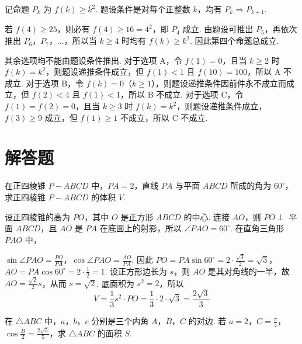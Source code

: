 \begin{solution}
记命题 \(P_k\) 为 \(f(k)\geqslant k^2\). 题设条件是对每个正整数 \(k\)，均有 \(P_k\Rightarrow P_{k+1}\).

若 \(f(4)\geqslant25\)，则必有 \(f(4)\geqslant16=4^2\)，即 \(P_4\) 成立. 由题设可推出 \(P_5\)，再依次推出 \(P_6\)，\(P_7\)，\(\ldots\)，所以当 \(k\geqslant4\) 时均有 \(f(k)\geqslant k^2\). 因此第四个命题总成立.

其余选项均不能由题设条件推出. 对于选项 A，令 \(f(1)=0\)，且当 \(k\geqslant2\) 时 \(f(k)=k^2\)，则题设递推条件成立，但 \(f(1)<1\) 且 \(f(10)=100\)，所以 A 不成立. 对于选项 B，令 \(f(k)=0\)（\(k\geqslant1\)），则题设递推条件因前件永不成立而成立，但 \(f(2)<4\) 且 \(f(1)<1\)，所以 B 不成立. 对于选项 C，令 \(f(1)=f(2)=0\)，且当 \(k\geqslant3\) 时 \(f(k)=k^2\)，则题设递推条件成立，\(f(3)\geqslant9\) 成立，但 \(f(1)\geqslant1\) 不成立，所以 C 不成立.
\end{solution}

\section{解答题}

\begin{problem}
在正四棱锥 \(P - ABCD\) 中，\(PA = 2\)，直线 \(PA\) 与平面 \(ABCD\) 所成的角为 \(60^{\circ}\)，求正四棱锥 \(P - ABCD\) 的体积 \(V\).

\end{problem}

\begin{solution}
设正四棱锥的高为 \(PO\)，其中 \(O\) 是正方形 \(ABCD\) 的中心. 连接 \(AO\)，则 \(PO\perp\) 平面 \(ABCD\)，且 \(AO\) 是 \(PA\) 在底面上的射影，所以 \(\angle PAO=60^{\circ}\). 在直角三角形 \(PAO\) 中，

\(\sin\angle PAO=\frac{PO}{PA}\)，\(\cos\angle PAO=\frac{AO}{PA}\). 因此 \(PO=PA\sin60^{\circ}=2\cdot\frac{\sqrt{3}}{2}=\sqrt{3}\)，\(AO=PA\cos60^{\circ}=2\cdot\frac{1}{2}=1\).
设正方形边长为 \(s\)，则 \(AO\) 是其对角线的一半，故 \(AO=\frac{\sqrt{2}}{2}s\)，从而 \(s=\sqrt{2}\). 底面积为 \(s^2=2\)，所以
\[
V=\frac{1}{3}s^2\cdot PO=\frac{1}{3}\cdot2\cdot\sqrt{3}=\frac{2\sqrt{3}}{3}
\]
\end{solution}

\begin{problem}
在 \(\triangle ABC\) 中，\(a\)，\(b\)，\(c\) 分别是三个内角 \(A\)，\(B\)，\(C\) 的对边. 若 \(a = 2\)，\(C = \frac{\pi}{4}\)，\(\cos \frac{B}{2} = \frac{2\sqrt{5}}{5}\)，求 \(\triangle ABC\) 的面积 \(S\).
\end{problem}

